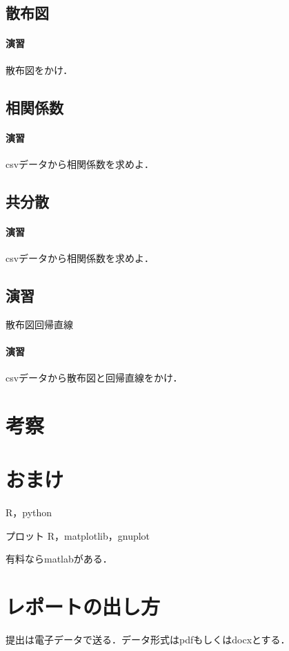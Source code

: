 \documentclass[12pt, a4j]{jreport}
\begin{document}
\subsection{散布図}

\paragraph{演習}
散布図をかけ．


\subsection{相関係数}

\paragraph{演習}
csvデータから相関係数を求めよ．

\subsection{共分散}

\paragraph{演習}
csvデータから相関係数を求めよ．

\subsection{演習}
散布図回帰直線

\paragraph{演習}

csvデータから散布図と回帰直線をかけ．


\section{考察}




\section{おまけ}
R，python

プロット
R，matplotlib，gnuplot


有料ならmatlabがある．

\section{レポートの出し方}

提出は電子データで送る．データ形式はpdfもしくはdocxとする．
\end{document}
